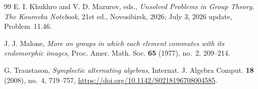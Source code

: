 \documentclass[11pt]{amsart}
\theoremstyle{definition}
\theoremstyle{remark}
\begin{document}
\begin{thebibliography}{99}
E. I. Khukhro and V. D. Mazurov, eds.,
\emph{Unsolved Problems in Group Theory. The Kourovka Notebook},
21st ed., Novosibirsk, 2026; July 3, 2026 update, Problem~11.46.

J. J. Malone,
\emph{More on groups in which each element commutes with its endomorphic
images},
Proc. Amer. Math. Soc. \textbf{65} (1977), no.~2, 209--214.

G. Traustason,
\emph{Symplectic alternating algebras},
Internat. J. Algebra Comput. \textbf{18} (2008), no.~4, 719--757,
\url{https://doi.org/10.1142/S0218196708004585}.

\end{thebibliography}
\end{document}

